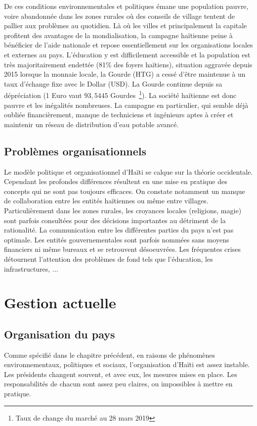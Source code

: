 \documentclass{eplmastersthesis_FR}
\begin{document}
				De ces conditions environnementales et politiques émane une population pauvre, voire abandonnée dans les zones rurales où des conseils de village tentent de pallier aux problèmes au quotidien. Là où les villes et principalement la capitale profitent des avantages de la mondialisation, la campagne haïtienne peine à bénéficier de l'aide nationale et repose essentiellement sur les organisations locales et externes au pays. L'éducation y est difficilement accessible et la population est très majoritairement endettée (81\% des foyers haïtiens), situation aggravée depuis 2015 lorsque la monnaie locale, la Gourde (HTG) a cessé d'être maintenue à un taux d'échange fixe avec le Dollar (USD). La Gourde continue depuis sa dépréciation (1 Euro vaut $93,5445$ Gourdes~\footnote{Taux de change du marché au 28 mars 2019}). La société haïtienne est donc pauvre et les inégalités nombreuses. La campagne en particulier, qui semble déjà oubliée financièrement, manque de techniciens et ingénieurs aptes à créer et maintenir un réseau de distribution d'eau potable avancé.

			\subsection*{Problèmes organisationnels}
				Le modèle politique et organisationnel d'Haïti se calque sur la théorie occidentale. Cependant les profondes différences résultent en une mise en pratique des concepts qui ne sont pas toujours efficaces.
				On constate notamment un manque de collaboration entre les entités haïtiennes ou même entre villages. Particulièrement dans les zones rurales, les croyances locales (religions, magie) sont parfois consultées pour des décisions importantes au détriment de la rationalité. La communication entre les différentes parties du pays n'est pas optimale. Les entités gouvernementales sont parfois nommées sans moyens financiers ni même bureaux et se retrouvent désoeuvrées. Les fréquentes crises détournent l'attention des problèmes de fond tels que l'éducation, les infrastructures, ...

		\section{Gestion actuelle}

			\subsection*{Organisation du pays}
			Comme spécifié dans le chapitre précédent, en raisons de phénomènes environnementaux, politiques et sociaux, l'organisation d'Haïti est assez instable. Les présidents changent souvent, et avec eux, les mesures mises en place. Les responsabilités de chacun sont assez peu claires, ou impossibles à mettre en pratique.
\end{document}
